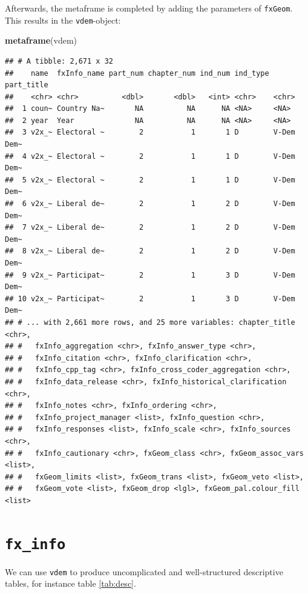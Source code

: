 \documentclass[]{report}
\newenvironment{Shaded}{\begin{snugshade}}{\end{snugshade}}
\newcommand{\KeywordTok}[1]{\textcolor[rgb]{0.13,0.29,0.53}{\textbf{#1}}}
\newcommand{\NormalTok}[1]{#1}
\theoremstyle{definition}
\theoremstyle{definition}
\theoremstyle{definition}
\theoremstyle{remark}
\begin{document}
Afterwards, the metaframe is completed by adding the parameters of
\texttt{fxGeom}. This results in the \texttt{vdem}-object:

\begin{Shaded}
\begin{Highlighting}[]
\KeywordTok{metaframe}\NormalTok{(vdem)}
\end{Highlighting}
\end{Shaded}

\begin{verbatim}
## # A tibble: 2,671 x 32
##    name  fxInfo_name part_num chapter_num ind_num ind_type part_title
##    <chr> <chr>          <dbl>       <dbl>   <int> <chr>    <chr>     
##  1 coun~ Country Na~       NA          NA      NA <NA>     <NA>      
##  2 year  Year              NA          NA      NA <NA>     <NA>      
##  3 v2x_~ Electoral ~        2           1       1 D        V-Dem Dem~
##  4 v2x_~ Electoral ~        2           1       1 D        V-Dem Dem~
##  5 v2x_~ Electoral ~        2           1       1 D        V-Dem Dem~
##  6 v2x_~ Liberal de~        2           1       2 D        V-Dem Dem~
##  7 v2x_~ Liberal de~        2           1       2 D        V-Dem Dem~
##  8 v2x_~ Liberal de~        2           1       2 D        V-Dem Dem~
##  9 v2x_~ Participat~        2           1       3 D        V-Dem Dem~
## 10 v2x_~ Participat~        2           1       3 D        V-Dem Dem~
## # ... with 2,661 more rows, and 25 more variables: chapter_title <chr>,
## #   fxInfo_aggregation <chr>, fxInfo_answer_type <chr>,
## #   fxInfo_citation <chr>, fxInfo_clarification <chr>,
## #   fxInfo_cpp_tag <chr>, fxInfo_cross_coder_aggregation <chr>,
## #   fxInfo_data_release <chr>, fxInfo_historical_clarification <chr>,
## #   fxInfo_notes <chr>, fxInfo_ordering <chr>,
## #   fxInfo_project_manager <list>, fxInfo_question <chr>,
## #   fxInfo_responses <list>, fxInfo_scale <chr>, fxInfo_sources <chr>,
## #   fxInfo_cautionary <chr>, fxGeom_class <chr>, fxGeom_assoc_vars <list>,
## #   fxGeom_limits <list>, fxGeom_trans <list>, fxGeom_veto <list>,
## #   fxGeom_vote <list>, fxGeom_drop <lgl>, fxGeom_pal.colour_fill <list>
\end{verbatim}

\section{\texorpdfstring{\texttt{fx\_info}}{fx\_info}}\label{fx_info-1}

We can use \texttt{vdem} to produce uncomplicated and well-structured
descriptive tables, for instance table \ref{tab:desc}.
\end{document}
